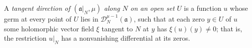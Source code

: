 \begin{definition}
\label{mc:tangent-direction-along}
\leanok
A \emph{tangent direction of \((\mathfrak a|_N,\mu)\) along \(N\) on an open set \(U\)} is a function \(u\) whose germ at every point of \(U\) lies in
\(\mathcal D_N^{\mu-1}(\mathfrak a)\), such that at each zero \(y\in U\) of \(u\) some holomorphic vector field \(\xi\) tangent to \(N\) at \(y\) has
\(\xi(u)(y)\ne0\); that is, the restriction \(u|_N\) has a nonvanishing differential at its zeros.
\end{definition}

